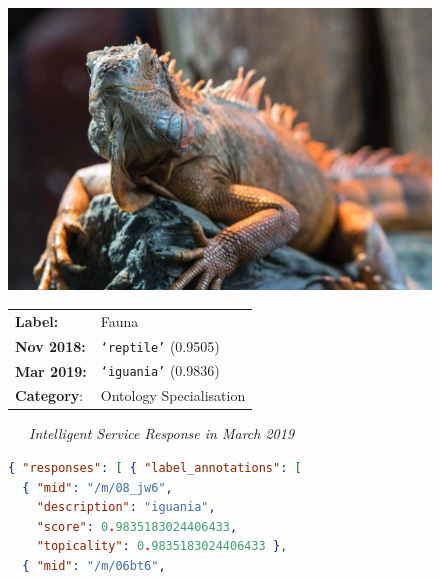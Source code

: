 \begin{figure}
    \begin{framed}
    \centering
    \begin{minipage}{\linewidth}
        \begin{shaded*}
            \begin{minipage}{0.3\linewidth}
            \includegraphics[width=\linewidth]{0052}
            \end{minipage}
            \hfill
            \begin{minipage}{0.65\linewidth}
                \begin{tabular}{ll}
                \textbf{Label:}&Fauna\\
                \textbf{Nov 2018:}&\texttt{`reptile'} (0.9505)\\
                \textbf{Mar 2019:}&\texttt{`iguania'} (0.9836)\\
                \textbf{Category}:&Ontology Specialisation
                \end{tabular}
            \end{minipage}
            \hfill
        \end{shaded*}
    \end{minipage}
    \begin{minipage}{\linewidth}
        \centering\bigskip
        \noindent\xrfill[0.45ex]{.5pt}~~~\textit{Intelligent Service Response in March 2019}~~~\xrfill[0.45ex]{.5pt}
        \begin{lstlisting}[language=json]
{ "responses": [ { "label_annotations": [
  { "mid": "/m/08_jw6",
    "description": "iguania",
    "score": 0.9835183024406433,
    "topicality": 0.9835183024406433 },
  { "mid": "/m/06bt6",

\end{lstlisting}
\end{minipage}
\end{framed}
\end{figure}
